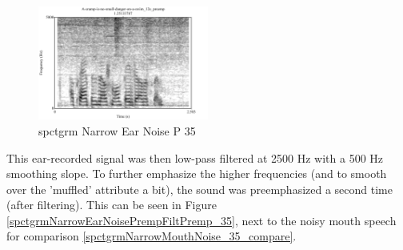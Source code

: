 \documentclass[dissertation,copyright]{uathesis}
\begin{document}
\begin{figure}
\includegraphics[width=0.5\textwidth]{figure/spctgrmNarrowEarNoisePremp.pdf}
\caption{spctgrm Narrow Ear Noise P 35}
\label{spctgrmNarrowEarNoisePremp_35}
\end{figure}

This ear-recorded signal was then low-pass filtered at 2500 Hz with a 500 Hz smoothing slope. To further emphasize the higher frequencies (and to smooth over the 'muffled' attribute a bit), the sound was preemphasized a second time (after filtering).  This can be seen in Figure \ref{spctgrmNarrowEarNoisePrempFiltPremp_35}, next to the noisy mouth speech for comparison \ref{spctgrmNarrowMouthNoise_35_compare}.
\end{document}
